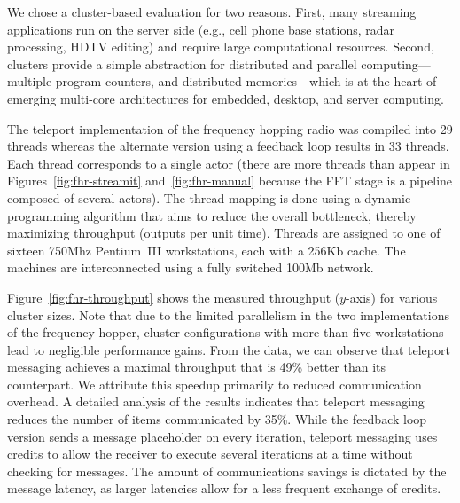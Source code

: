 
We chose a cluster-based evaluation for two reasons.  First, many
streaming applications run on the server side (e.g., cell phone base
stations, radar processing, HDTV editing) and require large
computational resources. Second, clusters provide a simple abstraction
for distributed and parallel computing---multiple program counters,
and distributed memories---which is at the heart of emerging
multi-core architectures for embedded, desktop, and server computing.

The teleport implementation of the frequency hopping radio was
compiled into 29 threads whereas the alternate version using a
feedback loop results in 33 threads.  Each thread corresponds to a
single actor (there are more threads than appear in
Figures~\ref{fig:fhr-streamit} and~\ref{fig:fhr-manual} because the
FFT stage is a pipeline composed of several actors).  The thread
mapping is done using a dynamic programming algorithm that aims to
reduce the overall bottleneck, thereby maximizing throughput (outputs
per unit time).  Threads are assigned to one of sixteen 750Mhz
Pentium~III workstations, each with a 256Kb cache.  The machines are
interconnected using a fully switched 100Mb network.

%

\clearpage
\noindent
%

Figure~\ref{fig:fhr-throughput} shows the measured throughput
($y$-axis) for various cluster sizes.  Note that due to the limited
parallelism in the two implementations of the frequency hopper,
cluster configurations with more than five workstations lead to
negligible performance gains. From the data, we can observe that
teleport messaging achieves a maximal throughput that is 49\% better
than its counterpart.  We attribute this speedup primarily to reduced
communication overhead.  A detailed analysis of the results indicates
that teleport messaging reduces the number of items communicated by
35\%.  While the feedback loop version sends a message placeholder on
every iteration, teleport messaging uses credits to allow the receiver
to execute several iterations at a time without checking for messages.
The amount of communications savings is dictated by the message
latency, as larger latencies allow for a less frequent exchange of
credits.

